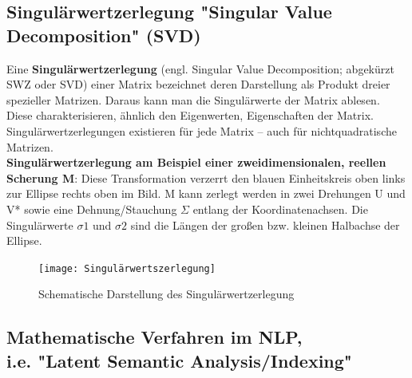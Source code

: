\documentclass[12pt]{article}
\begin{document}
\newpage


\subsection{Singulärwertzerlegung "Singular Value Decomposition" (SVD)}

Eine \textbf{Singulärwertzerlegung} (engl. Singular Value Decomposition; abgekürzt SWZ oder SVD) einer Matrix bezeichnet deren Darstellung als Produkt dreier spezieller Matrizen. Daraus kann man die Singulärwerte der Matrix ablesen. Diese charakterisieren, ähnlich den Eigenwerten, Eigenschaften der Matrix. Singulärwertzerlegungen existieren für jede Matrix – auch für nichtquadratische Matrizen.\\
\textbf{Singulärwertzerlegung am Beispiel einer zweidimensionalen, reellen Scherung M}: Diese Transformation verzerrt den blauen Einheitskreis oben links zur Ellipse rechts oben im Bild. M kann zerlegt werden in zwei Drehungen U und V* sowie eine Dehnung/Stauchung $\Sigma$  entlang der Koordinatenachsen. Die Singulärwerte $\sigma1$ und $\sigma2$ sind die Längen der großen bzw. kleinen Halbachse der Ellipse.\\ 
 
\begin{figure}[htb]
  \centering
  \texttt{[image: Singulärwertszerlegung]}
  \caption{Schematische Darstellung des Singulärwertzerlegung}
  \label{fig:svd-bild-1}
\end{figure}

\newpage

\subsection{Mathematische Verfahren im NLP,\\ i.e. "Latent Semantic Analysis/Indexing"}
\end{document}
